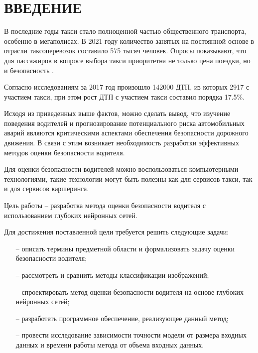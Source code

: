 \section*{ВВЕДЕНИЕ}

В последние годы такси стало полноценной частью общественного транспорта, особенно в мегаполисах.
В 2021 году количество занятых на постоянной основе в отрасли таксоперевозок составило 575 тысяч человек. Опросы показывают, что для пассажиров в вопросе выбора такси приоритетна не только цена поездки, но и безопасность \cite{wciom}.

Согласно исследованиям\cite{dtp} за 2017 год произошло 142000 ДТП, из которых 2917 с участием такси, при этом рост ДТП с участием такси составил порядка 17.5\%.

Исходя из приведенных выше фактов, можно сделать вывод, что изучение поведения водителей и прогнозирование потенциального риска автомобильных аварий являются критическими аспектами обеспечения безопасности дорожного движения. В связи с этим возникает необходимость разработки эффективных методов оценки безопасности водителя.

Для оценки безопасности водителей можно воспользоваться компьютерными технологиями, такие технологии могут быть полезны как для сервисов такси, так и для сервисов каршеринга.

Цель работы -- разработка метода оценки безопасности водителя с использованием глубоких нейронных сетей.

Для достижения поставленной цели требуется решить следующие задачи:
\begin{itemize}[leftmargin=1.6\parindent]
	\item[--] описать термины предметной области и формализовать задачу оценки безопасности водителя;
	\item[--] рассмотреть и сравнить методы классификации изображений;
	\item[--] спроектировать метод оценки безопасности водителя на основе глубоких нейронных сетей;
	\item[--] разработать программное обеспечение, реализующее данный метод;
	\item[--] провести исследование зависимости точности модели от размера входных данных и времени работы метода от объема входных данных.
\end{itemize}

\pagebreak